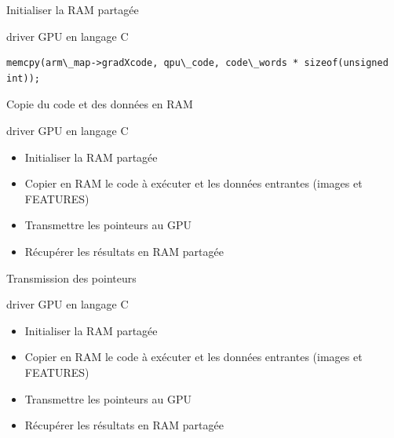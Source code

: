 \documentclass{bredelebeamer}
\begin{document}

\begin{frame}[fragile]{Initialiser la RAM partagée}

\begin{block}{driver GPU en langage C}
\lstset{style=CStyle}
\begin{lstlisting}
memcpy(arm\_map->gradXcode, qpu\_code, code\_words * sizeof(unsigned int));
\end{lstlisting}
\end{block}

\end{frame}


\begin{frame}{Copie du code et des données en RAM}

\begin{block}{driver GPU en langage C}
\begin{itemize}
\item Initialiser la RAM partagée
\item Copier en RAM le code à exécuter et les données entrantes (images et FEATURES)
\item Transmettre les pointeurs au GPU
\item Récupérer les résultats en RAM partagée
\end{itemize}
\end{block}

\end{frame}


\begin{frame}{Transmission des pointeurs}

\begin{block}{driver GPU en langage C}
\begin{itemize}
\item Initialiser la RAM partagée
\item Copier en RAM le code à exécuter et les données entrantes (images et FEATURES)
\item Transmettre les pointeurs au GPU
\item Récupérer les résultats en RAM partagée
\end{itemize}
\end{block}

\end{frame}
\end{document}

